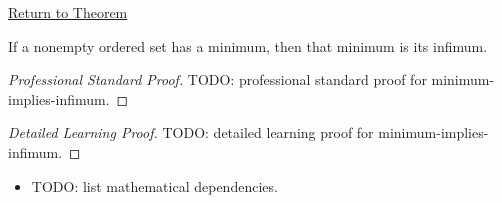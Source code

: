 \newpage
{}
\label{prf:minimum-implies-infimum}

\begin{remark*}[Return]
\hyperref[prop:minimum-implies-infimum]{Return to Theorem}
\end{remark*}

\begin{proposition*}
If a nonempty ordered set has a minimum, then that minimum is its infimum.
\end{proposition*}

\begin{proof}[Professional Standard Proof]
\LRAProofBodyStart
TODO: professional standard proof for minimum-implies-infimum.
\end{proof}

\begin{proof}[Detailed Learning Proof]
\LRAProofBodyStart
TODO: detailed learning proof for minimum-implies-infimum.
\end{proof}

\begin{remark*}
\end{remark*}

\begin{dependencies}
\begin{itemize}
  \item TODO: list mathematical dependencies.
\end{itemize}
\end{dependencies}

\clearpage
